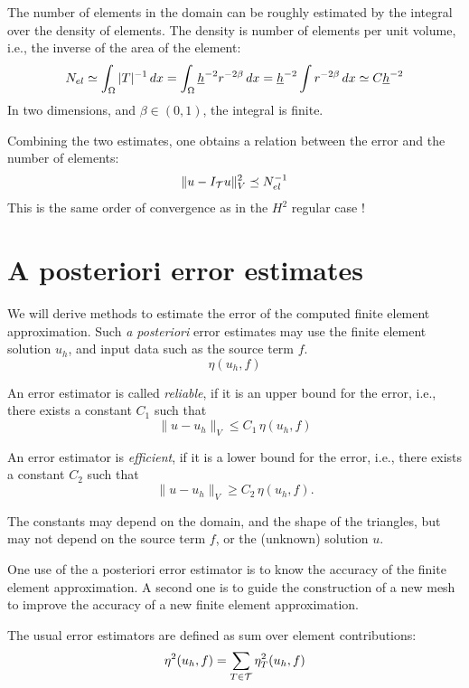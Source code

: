 The number of elements in the domain can be roughly estimated by the
integral over the density of elements. The density is number of elements per
unit volume, i.e., the inverse of the area of the element:
$$
N_{el} \simeq \int_\Omega |T|^{-1} \, dx =  \int_\Omega \underline h^{-2} r^{-2 \beta} \, dx = \underline h^{-2} \int r^{-2\beta} \, dx \simeq C \underline h^{-2}
$$
In two dimensions, and $\beta \in (0,1)$, the integral is finite.

Combining the two estimates, one obtains a relation between the error and the
number of elements:
$$
\| u - I_{\cal T} u \|_V^2 \preceq N_{el}^{-1}
$$
This is the same order of convergence as in the $H^2$ regular case !


\section{A posteriori error estimates}

We will derive methods to estimate the error of the computed finite
element approximation. Such {\em a posteriori} error estimates may use the finite element solution $u_h$, and input data such as the source term $f$. 
$$
\eta(u_h, f)
$$

An error estimator is called {\em reliable}, if it is an upper bound for the error,
i.e., there exists a constant $C_1$ such that
\begin{equation}
\label{equ_reliable}
\| u - u_h \|_V \leq C_1 \, \eta(u_h, f)
\end{equation}

An error estimator is {\em efficient}, if it is a lower bound for the error,
i.e., there exists a constant $C_2$ such that
\begin{equation}
\label{equ_efficient}
\| u - u_h \|_V \geq C_2 \, \eta(u_h, f).
\end{equation}

The constants may depend on the domain, and the shape of the triangles,
but may not depend on the source term $f$, or the (unknown)
solution $u$.

\bigskip

One use of the a posteriori error estimator is to know the accuracy of
the finite element approximation. A second one is to guide the
construction of a new mesh to improve the accuracy of a new finite
element approximation.
 
The usual error estimators are defined as sum over element contributions:
$$
\eta^2 (u_h, f) = \sum_{T \in {\cal T}} \eta_T^2 (u_h, f)
$$

